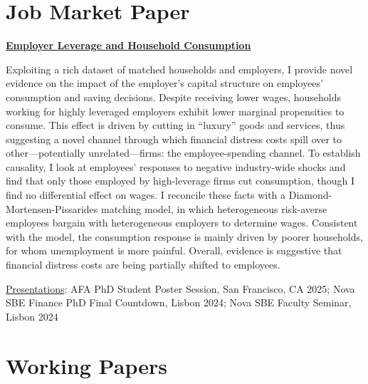 \documentclass[letterpaper]{article}
\newenvironment{itemize*}{
  \begin{list}{}{
    \setlength{\leftmargin}{1.5em}
  }
}{
  \end{list}
}
\begin{document}
\section*{Job Market Paper}
\vspace{-0.2in}
\hrulefill
\begin{itemize*}
\item \href{https://papers.ssrn.com/sol3/papers.cfm?abstract_id=4784540}{\color{blue}\textbf{Employer Leverage and Household Consumption}}
\item Exploiting a rich dataset of matched households and employers, I provide novel evidence on the impact of the employer's capital structure on employees' consumption and saving decisions. Despite receiving lower wages, households working for highly leveraged employers exhibit lower marginal propensities to consume. This effect is driven by cutting in ``luxury'' goods and services, thus suggesting a novel channel through which financial distress costs spill over to other---potentially unrelated---firms: the employee-spending channel. To establish causality, I look at employees' responses to negative industry-wide shocks and find that only those employed by high-leverage firms cut consumption, though I find no differential effect on wages. I reconcile these facts with a Diamond-Mortensen-Pissarides matching model, in which heterogeneous risk-averse employees bargain with heterogeneous employers to determine wages. Consistent with the model, the consumption response is mainly driven by poorer households, for whom unemployment is more painful. Overall, evidence is suggestive that financial distress costs are being partially shifted to employees.

\underline{Presentations}: AFA PhD Student Poster Session, San Francisco, CA 2025; Nova SBE Finance PhD Final Countdown, Lisbon 2024; Nova SBE Faculty Seminar, Lisbon 2024
\end{itemize*}

\section*{Working Papers}
\vspace{-0.2in}
\hrulefill
\end{document}
